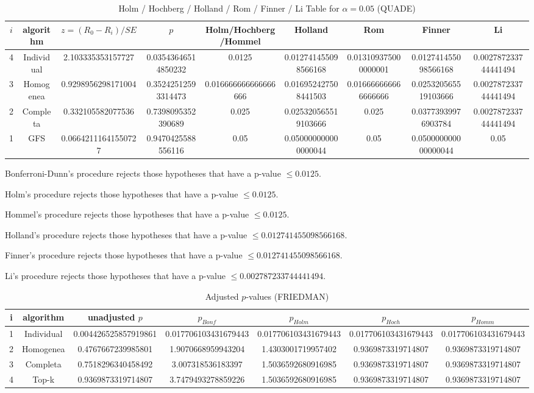 \documentclass[a4paper,10pt]{article}
\begin{document}
\begin{landscape}
\begin{table}[!htp]
\centering\scriptsize
\caption{Holm / Hochberg / Holland / Rom / Finner / Li Table for $\alpha=0.05$ (QUADE)}
\begin{tabular}{ccccccccc}
$i$&algorithm&$z=(R_0 - R_i)/SE$&$p$&Holm/Hochberg/Hommel&Holland&Rom&Finner&Li\\
\hline
4&Individual&2.103335353157727&0.03543646514850232&0.0125&0.012741455098566168&0.013109375000000001&0.012741455098566168&0.002787233744441494\\
3&Homogenea&0.9298956298171004&0.35242512593314473&0.016666666666666666&0.016952427508441503&0.016666666666666666&0.025320565519103666&0.002787233744441494\\
2&Completa&0.332105582077536&0.7398095352390689&0.025&0.025320565519103666&0.025&0.03773939976903784&0.002787233744441494\\
1&GFS&0.06642111641550727&0.9470425588556116&0.05&0.050000000000000044&0.05&0.050000000000000044&0.05\\
\hline
\end{tabular}
\end{table}
Bonferroni-Dunn's procedure rejects those hypotheses that have a p-value $\le0.0125$.


Holm's procedure rejects those hypotheses that have a p-value $\le0.0125$.


Hommel's procedure rejects those hypotheses that have a p-value $\le0.0125$.


Holland's procedure rejects those hypotheses that have a p-value $\le0.012741455098566168$.


Finner's procedure rejects those hypotheses that have a p-value $\le0.012741455098566168$.


Li's procedure rejects those hypotheses that have a p-value $\le0.002787233744441494$.



\newpage

\begin{table}[!htp]
\centering\scriptsize
\caption{Adjusted $p$-values (FRIEDMAN)}
\begin{tabular}{ccccccc}
i&algorithm&unadjusted $p$&$p_{Bonf}$&$p_{Holm}$&$p_{Hoch}$&$p_{Homm}$\\
\hline
1&Individual&0.004426525857919861&0.017706103431679443&0.017706103431679443&0.017706103431679443&0.017706103431679443\\
2&Homogenea&0.4767667239985801&1.9070668959943204&1.4303001719957402&0.9369873319714807&0.9369873319714807\\
3&Completa&0.7518296340458492&3.007318536183397&1.5036592680916985&0.9369873319714807&0.9369873319714807\\
4&Top-k&0.9369873319714807&3.7479493278859226&1.5036592680916985&0.9369873319714807&0.9369873319714807\\
\hline
\end{tabular}
\end{table}


\end{landscape}
\end{document}

